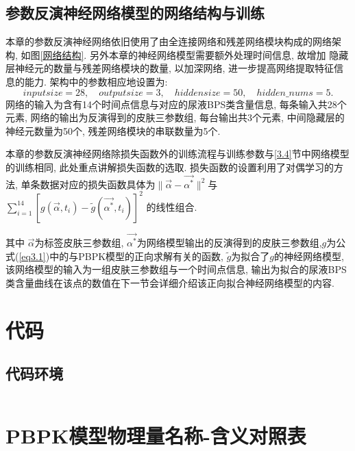 \documentclass[a4paper,punct=banjiao,twoside]{ctexrep}
\theoremstyle{plain}
\theoremstyle{definition}
\theoremstyle{remark}
\begin{document}
\section{参数反演神经网络模型的网络结构与训练}
本章的参数反演神经网络依旧使用了由全连接网络和残差网络模块构成的网络架构, 如图\ref{网络结构}. 另外本章的神经网络模型需要额外处理时间信息, 故增加
隐藏层神经元的数量与残差网络模块的数量, 以加深网络, 进一步提高网络提取特征信息的能力.
架构中的参数相应地设置为:
$$
inputsize = 28,\quad outputsize = 3,\quad hiddensize = 50, \quad hidden\_nums = 5.
$$
\noindent 网络的输入为含有14个时间点信息与对应的尿液BPS类含量信息, 每条输入共28个元素, 网络的输出为反演得到的皮肤三参数组, 每台输出共3个元素, 
中间隐藏层的神经元数量为50个, 残差网络模块的串联数量为5个.

本章的参数反演神经网络除损失函数外的训练流程与训练参数与\ref{3.4}节中网络模型的训练相同, 此处重点讲解损失函数的选取.
损失函数的设置利用了对偶学习的方法, 单条数据对应的损失函数具体为$\|\vec{\alpha}-\vec{\alpha^*} \|^2$与
$\sum_{i = 1}^{14}  [g(\vec{\alpha}, t_i)-\tilde{g}(\vec{\alpha^*}, t_i) ]^2$
的线性组合.

其中
$\vec{\alpha}$为标签皮肤三参数组, $\vec{\alpha^*}$为网络模型输出的反演得到的皮肤三参数组,$g$为公式(\ref{eq3.1})中的与PBPK模型的正向求解有关的函数, 
$\tilde{g}$为拟合了$g$的神经网络模型, 该网络模型的输入为一组皮肤三参数组与一个时间点信息, 输出为拟合的尿液BPS类含量曲线在该点的数值在下一节会详细介绍该正向拟合神经网络模型的内容.















\clearpage
\mbox{}
\thispagestyle{empty}

\appendix
\chapter{代码}
\section{代码环境}
\begin{lstlisting}[language=PYTHON]

\end{lstlisting}
\chapter{PBPK模型物理量名称-含义对照表}
\end{document}
